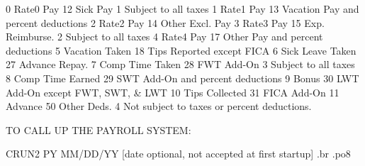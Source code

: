  0  Rate0 Pay	       12  Sick Pay	      1  Subject to all taxes
 1  Rate1 Pay	       13  Vacation Pay 	 and percent deductions
 2  Rate2 Pay	       14  Other Excl. Pay
 3  Rate3 Pay	       15  Exp. Reimburse.    2  Subject to all taxes
 4  Rate4 Pay	       17  Other Pay		 and percent deductions
 5  Vacation Taken     18  Tips Reported	 except FICA
 6  Sick Leave Taken   27  Advance Repay.
 7  Comp Time Taken    28  FWT Add-On	      3  Subject to all taxes
 8  Comp Time Earned   29  SWT Add-On		 and percent deductions
 9  Bonus	       30  LWT Add-On		 except FWT, SWT, & LWT
10  Tips Collected     31  FICA Add-On
11  Advance	       50  Other Deds.	      4  Not subject to taxes or
						 percent deductions.

		TO CALL UP THE PAYROLL SYSTEM:

   CRUN2 PY MM/DD/YY  [date optional, not accepted at first startup]
.br
.po8

